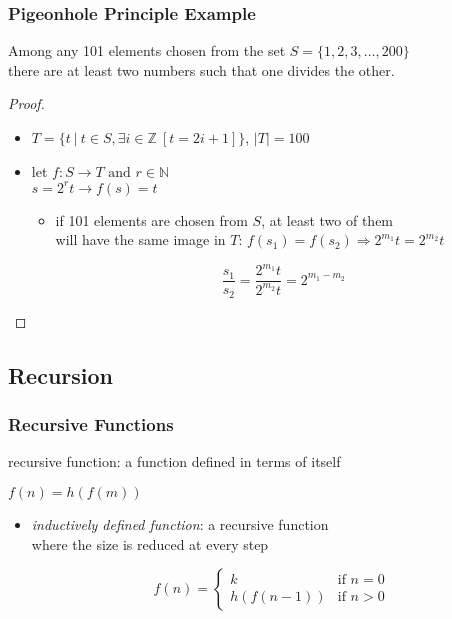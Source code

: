 \documentclass[dvipsnames]{beamer}
\begin{document}
\begin{frame}
  \frametitle{Pigeonhole Principle Example}

  \begin{theorem}
   Among any 101 elements chosen from the set $S = \{1,2,3,\dots,200\}$\\
   there are at least two numbers such that one divides the other.
  \end{theorem}

  \pause
  \begin{proof}
    \begin{itemize}
      \item $T=\{t~|~t \in S, \exists i \in \mathbb{Z}~[t=2i+1]\}$, $|T|=100$

      \pause
      \item let $f: S \rightarrow T \mbox{ and }r \in \mathbb{N}$\\
        $s = 2^r t \rightarrow f(s) = t$
      \begin{itemize}
        \item if 101 elements are chosen from $S$, at least two of them\\
          will have the same image in $T$:
          $f(s_1)=f(s_2) \Rightarrow 2^{m_1} t = 2^{m_2} t$

        \pause
        \[
          \frac {s_1} {s_2} = \frac {2^{m_1} t} {2^{m_2} t} = 2^{m_1 - m_2}
        \]
      \end{itemize}
    \end{itemize}
  \end{proof}
\end{frame}

\subsection{Recursion}

\begin{frame}
  \frametitle{Recursive Functions}

  \begin{definition}
    \alert{recursive function}: a function defined in terms of itself

    \medskip
    $f(n) = h(f(m))$
  \end{definition}

  \begin{itemize}
    \item \emph{inductively defined function}: a recursive function\\
      where the size is reduced at every step

    \medskip
    \[
      f(n) =
        \begin{cases}
          k         & \mbox{if } n = 0\\
          h(f(n-1)) & \mbox{if } n > 0
        \end{cases}
    \]
  \end{itemize}
\end{frame}
\end{document}
